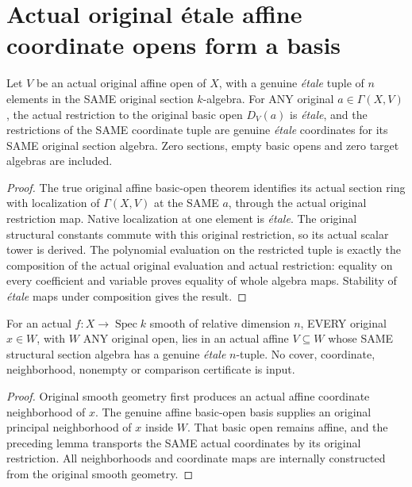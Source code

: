 \section{Actual original \'etale affine coordinate opens form a basis}
\label{sec:smooth-etale-affine-basis}

\begin{lemma}
\label{lem:cartier-original-principal-etale-coordinates}
\leanok
Let $V$ be an actual original affine open of $X$, with a genuine
\emph{\'etale} tuple of $n$ elements in the SAME original section
$k$-algebra. For ANY original $a\in\Gamma(X,V)$, the actual
restriction to the original basic open $D_V(a)$ is \emph{\'etale},
and the restrictions of the SAME coordinate tuple are genuine
\emph{\'etale} coordinates for its SAME original section algebra.
Zero sections, empty basic opens and zero target algebras are included.
\end{lemma}
\begin{proof}
The true original affine basic-open theorem identifies its actual
section ring with localization of $\Gamma(X,V)$ at the SAME $a$,
through the actual original restriction map. Native localization
at one element is \emph{\'etale}. The original structural constants
commute with this original restriction, so its actual scalar tower
is derived. The polynomial evaluation on the restricted tuple is
exactly the composition of the actual original evaluation and
actual restriction: equality on every coefficient and variable
proves equality of whole algebra maps. Stability of
\emph{\'etale} maps under composition gives the result.
\end{proof}

\begin{theorem}
\label{thm:cartier-original-smooth-etale-subchart}
\leanok
For an actual $f:X\to\operatorname{Spec}k$ smooth of relative
dimension $n$, EVERY original $x\in W$, with $W$ ANY original
open, lies in an actual affine $V\subseteq W$ whose SAME structural
section algebra has a genuine \emph{\'etale} $n$-tuple. No cover,
coordinate, neighborhood, nonempty or comparison certificate is input.
\end{theorem}
\begin{proof}
Original smooth geometry first produces an actual affine coordinate
neighborhood of $x$. The genuine affine basic-open basis supplies
an original principal neighborhood of $x$ inside $W$. That basic
open remains affine, and the preceding lemma transports the SAME
actual coordinates by its original restriction. All neighborhoods
and coordinate maps are internally constructed from the original
smooth geometry.
\end{proof}

